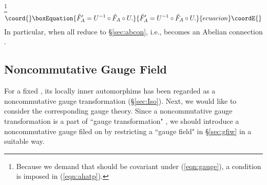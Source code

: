 \documentclass[10pt,a4paper]{article}
\def\hA{{\hat A}}
\begin{document}
\footnote{Because we demand that \coordHE{} should be covariant under (\ref{eqn:gauge}), a condition \coordHE{} is imposed in (\ref{eqn:ahatp}).}
\begin{equation}\coord{}\boxEquation{
{\hat F}_A'=U^{-1}\circ {\hat F}_A \circ U.
}{
{\hat F}_A'=U^{-1}\circ {\hat F}_A \circ U.
}{ecuacion}\coordE{}\end{equation}
In particular, when \coordHE{} all reduce to \S\ref{sec:abcon}, i.e., \myHighlight{$\hA$}\coordHE{} becomes an Abelian connection \coordHE{}. 



\subsection{Noncommutative Gauge Field
\label{sec:ncgfss}}

For a fixed \coordHE{}, its locally inner automorphims \coordHE{} has been regarded as a noncommutative gauge transformation (\S\ref{sec:Iso}). Next, we would like to consider the corresponding gauge theory. Since a noncommutative gauge transformation \coordHE{} is a part of ``gauge transformation" \coordHE{}, we should introduce a noncommutative gauge filed on \coordHE{} by restricting a ``gauge field" \myHighlight{$\hA$}\coordHE{} in \S\ref{sec:gfiw} in a suitable way.\\
\end{document}
